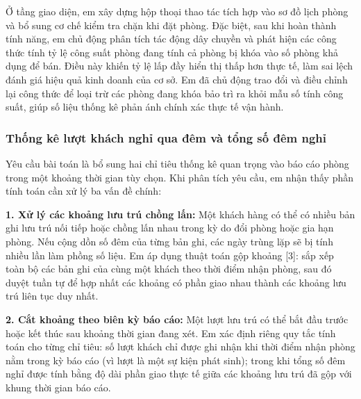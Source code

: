 Ở tầng giao diện, em xây dựng hộp thoại thao tác tích hợp vào sơ đồ lịch phòng và bổ sung cơ chế kiểm tra chặn khi đặt phòng. Đặc biệt, sau khi hoàn thành tính năng, em chủ động phân tích tác động dây chuyền và phát hiện các công thức tính tỷ lệ công suất phòng đang tính cả phòng bị khóa vào số phòng khả dụng để bán. Điều này khiến tỷ lệ lấp đầy hiển thị thấp hơn thực tế, làm sai lệch đánh giá hiệu quả kinh doanh của cơ sở. Em đã chủ động trao đổi và điều chỉnh lại công thức để loại trừ các phòng đang khóa bảo trì ra khỏi mẫu số tính công suất, giúp số liệu thống kê phản ánh chính xác thực tế vận hành.

\subsubsection{Thống kê lượt khách nghỉ qua đêm và tổng số đêm nghỉ}

Yêu cầu bài toán là bổ sung hai chỉ tiêu thống kê quan trọng vào báo cáo phòng trong một khoảng thời gian tùy chọn. Khi phân tích yêu cầu, em nhận thấy phần tính toán cần xử lý ba vấn đề chính:

\textbf{1. Xử lý các khoảng lưu trú chồng lấn:} Một khách hàng có thể có nhiều bản ghi lưu trú nối tiếp hoặc chồng lấn nhau trong kỳ do đổi phòng hoặc gia hạn phòng. Nếu cộng dồn số đêm của từng bản ghi, các ngày trùng lặp sẽ bị tính nhiều lần làm phồng số liệu. Em áp dụng thuật toán gộp khoảng [3]: sắp xếp toàn bộ các bản ghi của cùng một khách theo thời điểm nhận phòng, sau đó duyệt tuần tự để hợp nhất các khoảng có phần giao nhau thành các khoảng lưu trú liên tục duy nhất.

\textbf{2. Cắt khoảng theo biên kỳ báo cáo:} Một lượt lưu trú có thể bắt đầu trước hoặc kết thúc sau khoảng thời gian đang xét. Em xác định riêng quy tắc tính toán cho từng chỉ tiêu: số lượt khách chỉ được ghi nhận khi thời điểm nhận phòng nằm trong kỳ báo cáo (vì lượt là một sự kiện phát sinh); trong khi tổng số đêm nghỉ được tính bằng độ dài phần giao thực tế giữa các khoảng lưu trú đã gộp với khung thời gian báo cáo.

